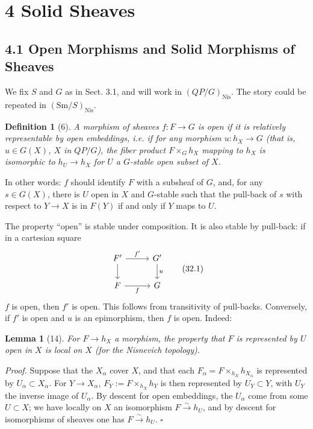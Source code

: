 \documentclass[11pt]{article}
\newcommand{\Nis}{\mathrm{Nis}}
\newcommand{\Sm}{\mathrm{Sm}}
\theoremstyle{deligne}
\newtheorem*{lemma*}{Lemma}
\newtheorem*{definition*}{Definition}
\newenvironment{proofdel}{\noindent\textit{Proof.}}{\hfill$\square$}
\begin{document}
\section*{4 Solid Sheaves}

\subsection*{4.1 Open Morphisms and Solid Morphisms of Sheaves}

We fix \(S\) and \(G\) as in Sect. 3.1, and will work in \((QP/G)_{\Nis}\). The story could be repeated in \((\Sm/S)_{\Nis}\).

\begin{definition*}[6]
A morphism of sheaves \(f:F\to G\) is open if it is relatively representable by open embeddings, i.e. if for any morphism \(u:h_X\to G\) (that is, \(u\in G(X)\), \(X\) in \(QP/G\)), the fiber product \(F\times_G h_X\) mapping to \(h_X\) is isomorphic to \(h_U\to h_X\) for \(U\) a \(G\)-stable open subset of \(X\).
\end{definition*}

In other words: \(f\) should identify \(F\) with a subsheaf of \(G\), and, for any \(s\in G(X)\), there is \(U\) open in \(X\) and \(G\)-stable such that the pull-back of \(s\) with respect to \(Y\to X\) is in \(F(Y)\) if and only if \(Y\) maps to \(U\).

The property ``open'' is stable under composition. It is also stable by pull-back: if in a cartesian square
\[
\begin{tikzcd}[column sep=2.8em,row sep=1.8em]
F' \arrow[r,"f'"] \arrow[d] & G' \arrow[d,"u"] \\
F \arrow[r,"f"'] & G
\end{tikzcd}
\tag{32.1}
\]
\(f\) is open, then \(f'\) is open. This follows from transitivity of pull-backs. Conversely, if \(f'\) is open and \(u\) is an epimorphism, then \(f\) is open. Indeed:

\begin{lemma*}[14]
For \(F\to h_X\) a morphism, the property that \(F\) is represented by \(U\) open in \(X\) is local on \(X\) (for the Nisnevich topology).
\end{lemma*}

\begin{proofdel}
Suppose that the \(X_\alpha\) cover \(X\), and that each \(F_\alpha=F\times_{h_X}h_{X_\alpha}\) is represented by \(U_\alpha\subset X_\alpha\). For \(Y\to X_\alpha\), \(F_Y:=F\times_{h_X}h_Y\) is then represented by \(U_Y\subset Y\), with \(U_Y\) the inverse image of \(U_\alpha\). By descent for open embeddings, the \(U_\alpha\) come from some \(U\subset X\); we have locally on \(X\) an isomorphism \(F\xrightarrow{\sim}h_U\), and by descent for isomorphisms of sheaves one has \(F\xrightarrow{\sim}h_U\).
\end{proofdel}
\end{document}
